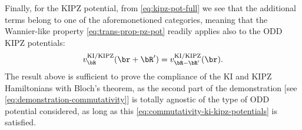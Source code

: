 Finally, for the KIPZ potential, from \cref{eq:kipz-pot-full} we see that the additional terms belong to one of the aforemonetioned categories, meaning that the Wannier-like property \eqref{eq:trans-prop-pz-pot} readily applies also to the ODD KIPZ potentials:
%
\begin{equation}
    v^{\rm KI/KIPZ}_{\bR}(\br+\bR') = v^{\rm KI/KIPZ}_{\bR-\bR'}(\br) .
    \label{eq:commutativity-ki-kipz-potentials}
\end{equation}
%
    The result above is sufficient to prove the compliance of the KI and KIPZ Hamiltonians with Bloch's theorem, as the second part of the demonstration [see \cref{eq:demonstration-commutativity}] is totally agnostic of the type of ODD potential considered, as long as this \cref{eq:commutativity-ki-kipz-potentials} is satisfied.
